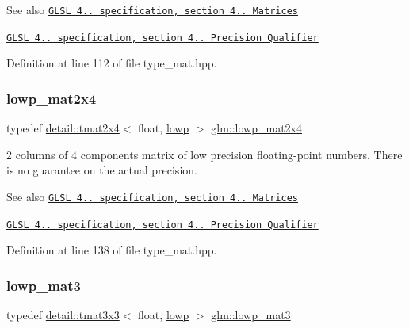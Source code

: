 \begin{DoxySeeAlso}{See also}
\href{http://www.opengl.org/registry/doc/GLSLangSpec.4.20.8.pdf}{\tt G\+L\+SL 4.. specification, section 4.. Matrices} 

\href{http://www.opengl.org/registry/doc/GLSLangSpec.4.20.8.pdf}{\tt G\+L\+SL 4.. specification, section 4.. Precision Qualifier} 
\end{DoxySeeAlso}


Definition at line 112 of file type\+\_\+mat.\+hpp.

\mbox{\label{group__core__precision_gaa62e33ee2864909c8522a549fbf40ce5}} 
\subsubsection{\texorpdfstring{lowp\+\_\+mat2x4}{lowp\_mat2x4}}
{\footnotesize\ttfamily typedef \hyperlink{structglm_1_1detail_1_1tmat2x4}{detail\+::tmat2x4}$<$ float, \hyperlink{namespaceglm_a0f04f086094c747d227af4425893f545ae161af3fc695e696ce3bf69f7332bc2d}{lowp} $>$ \hyperlink{group__core__precision_gaa62e33ee2864909c8522a549fbf40ce5}{glm\+::lowp\+\_\+mat2x4}}

2 columns of 4 components matrix of low precision floating-\/point numbers. There is no guarantee on the actual precision.

\begin{DoxySeeAlso}{See also}
\href{http://www.opengl.org/registry/doc/GLSLangSpec.4.20.8.pdf}{\tt G\+L\+SL 4.. specification, section 4.. Matrices} 

\href{http://www.opengl.org/registry/doc/GLSLangSpec.4.20.8.pdf}{\tt G\+L\+SL 4.. specification, section 4.. Precision Qualifier} 
\end{DoxySeeAlso}


Definition at line 138 of file type\+\_\+mat.\+hpp.

\mbox{\label{group__core__precision_gaae2935658c6a3668ac1935a7f6064d51}} 
\subsubsection{\texorpdfstring{lowp\+\_\+mat3}{lowp\_mat3}}
{\footnotesize\ttfamily typedef \hyperlink{structglm_1_1detail_1_1tmat3x3}{detail\+::tmat3x3}$<$ float, \hyperlink{namespaceglm_a0f04f086094c747d227af4425893f545ae161af3fc695e696ce3bf69f7332bc2d}{lowp} $>$ \hyperlink{group__core__precision_gaae2935658c6a3668ac1935a7f6064d51}{glm\+::lowp\+\_\+mat3}}

